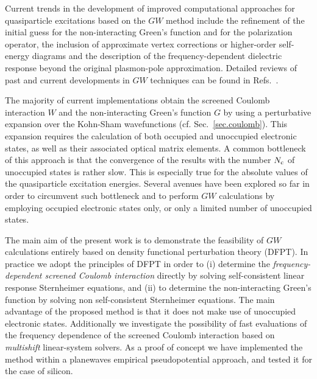 \documentclass[twocolumn,prb,showpacs,superscriptaddress]{revtex4}
\begin{document}
Current trends in the development of improved computational approaches for
quasiparticle excitations based on the $GW$ method include the refinement
of the initial guess for the non-interacting Green's function and for the
polarization operator,\cite{rinke,schilfegarde}
the inclusion of approximate vertex corrections or higher-order self-energy
diagrams\cite{york} and the description of the frequency-dependent
dielectric response beyond the original plasmon-pole approximation.\cite{spacetime,blochl}
Detailed reviews of past and current developments in $GW$ techniques can be
found in Refs.\ .

The majority of current implementations obtain the screened Coulomb interaction
$W$ and the non-interacting Green's function $G$ by using a perturbative
expansion over the Kohn-Sham wavefunctions (cf. Sec.\ \ref{sec.coulomb}). This expansion
requires the calculation of both occupied and unoccupied electronic states,
as well as their associated optical matrix elements.\cite{hl86} A common bottleneck 
of this approach is that the convergence of the results with the number $N_{\rm c}$ 
of unoccupied states is rather slow.\cite{sohrab} This is especially true for
the absolute values of the quasiparticle excitation energies.\cite{bruneval-gonze}
%
Several avenues have been explored so far in order to circumvent such bottleneck 
and to perform $GW$ calculations by employing occupied electronic states only,\cite{reining-sternheimer,umari1,umari2,gygi}
or only a limited number of unoccupied states.\cite{bruneval-gonze}


The main aim of the present work is to demonstrate the feasibility of $GW$ calculations
entirely based on density functional perturbation theory (DFPT).\cite{baroni.rmp}
In practice we adopt the principles of DFPT in order to (i) determine 
the {\it frequency-dependent screened Coulomb interaction} directly
by solving self-consistent linear response Sternheimer equations,
and (ii) to determine the non-interacting Green's function by solving
non self-consistent Sternheimer equations. The main advantage of the proposed method 
is that it does not make use of unoccupied electronic states.
Additionally we investigate the possibility of fast evaluations of 
the frequency dependence of the screened Coulomb interaction
based on {\it multishift} linear-system solvers.\cite{frommer}
%
As a proof of concept we have implemented the method within
a planewaves empirical pseudopotential approach,\cite{cohen_berg} 
and tested it for the case of silicon.
\end{document}

